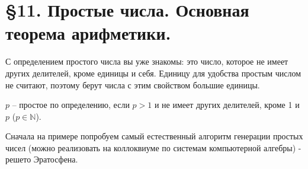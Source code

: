 \documentclass[russian]{lecture-notes}
\begin{document}
	\section*{\S 11. Простые числа. Основная теорема арифметики.}		
		
	С определением простого числа вы уже знакомы: это число, которое не имеет других делителей, кроме единицы и себя. Единицу для удобства простым числом не считают, поэтому берут числа с этим свойством большие единицы. 
	
	\begin{definition}
		$p$ -- простое по определению, если $p > 1$ и не имеет других делителей, кроме 1 и $p$ ($p \in \mathbb{N}$).
	\end{definition}

	Сначала на примере попробуем самый естественный алгоритм генерации простых чисел (можно реализовать на коллоквиуме по системам компьютерной алгебры) - решето Эратосфена.
		
\end{document}
